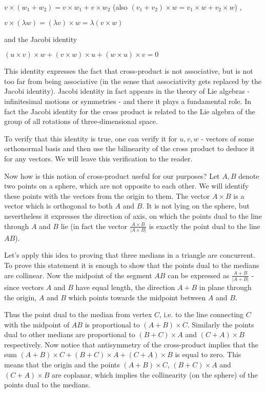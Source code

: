$v\times (w_1+w_2)=v\times w_1 + v\times w_2$ (also $(v_1+v_2)\times w=v_1\times w + v_2\times w$) ,

$v\times (\lambda w)=(\lambda v) \times w = \lambda (v\times w)$

and the Jacobi identity

$(u\times v) \times w+(v\times w)\times u+(w\times u)\times v=0$

This identity expresses the fact that cross-product is not associative, but is not too far from being associative (in the sense that associativity gets replaced by the Jacobi identity). Jacobi identity in fact appears in the theory of Lie algebras - infinitesimal motions or symmetries - and there it plays a fundamental role. In fact the Jacobi identity for the cross product is related to the Lie algebra of the group of all rotations of three-dimensional space.

To verify that this identity is true, one can verify it for $u,v,w$ - vectors of some orthonormal basis and then use the bilinearity of the cross product to deduce it for any vectors. We will leave this verification to the reader.

Now how is this notion of cross-product useful for our purposes? Let $A,B$ denote two points on a sphere, which are not opposite to each other. We will identify these points with the vectors from the origin to them. The vector $A\times B$ is a vector which is orthogonal to both $A$ and $B$. It is not lying on the sphere, but nevertheless it expresses the direction of axis, on which the points dual to the line through $A$ and $B$ lie (in fact the vector $\frac{A\times B}{|A\times B|}$ is exactly the point dual to the line $AB$).

Let's apply this idea to proving that three medians in a triangle are concurrent. To prove this statement it is enough to show that the points dual to the medians are collinear. Now the midpoint of the segment $AB$ can be expressed as $\frac{A+B}{|A+B|}$ - since vectors $A$ and $B$ have equal length, the direction $A+B$ in plane through the origin, $A$ and $B$ which points towards the midpoint between $A$ and $B$.

Thus the point dual to the median from vertex $C$, i.e. to the line connecting $C$ with the midpoint of $AB$ is proportional to $(A+B)\times C$. Similarly the points dual to other medians are proportional to $(B+C)\times A$ and $(C+A)\times B$ respectively. Now notice that antisymmetry of the cross-product implies that the sum $(A+B)\times C+(B+C)\times A+(C+A)\times B$ is equal to zero. This means that the origin and the points $(A+B)\times C$, $(B+C)\times A$ and $(C+A)\times B$ are coplanar, which implies the collinearity (on the sphere) of the points dual to the medians.

